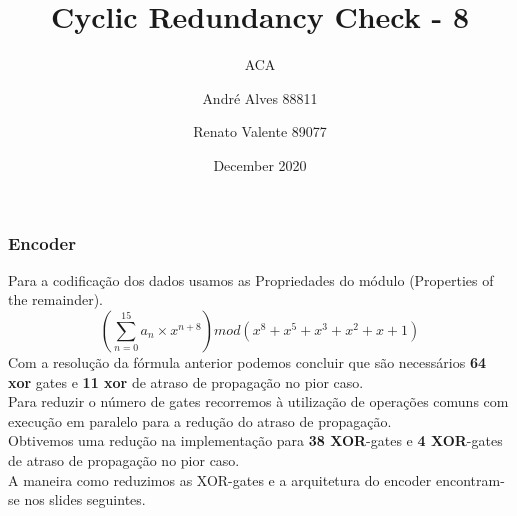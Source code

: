 \documentclass{beamer}
\title{Cyclic Redundancy Check - 8}
\subtitle{ACA}
\author{André Alves 88811 \\ \and Renato Valente 89077}
\date{December 2020}
\institute[UA]{Departamento de Eletrónica, Telecomunicações e Informática\\Universidade de Aveiro}
\begin{document}
\maketitle





\begin{frame}
\frametitle{Encoder}

    Para a codificação dos dados usamos as Propriedades do módulo (Properties of the remainder).\\
    $$ ( \sum_{n=0}^{15} a_{n} \times x^{n+8} ) mod ( x^8 + x^5 + x^3 + x^2 + x + 1 ) $$ 
    Com a resolução da fórmula anterior podemos concluir que são necessários \textbf{64 xor} gates e \textbf{11 xor} de atraso de propagação no pior caso.\\
    Para reduzir o número de gates recorremos à utilização de operações comuns com execução em paralelo para a redução do atraso de propagação. \\
    Obtivemos uma redução na implementação para \textbf{38 XOR}-gates e \textbf{4 XOR}-gates de atraso de propagação no pior caso.\\
    A maneira como reduzimos as XOR-gates e a arquitetura do encoder encontram-se nos slides seguintes.

\end{frame}
\end{document}
